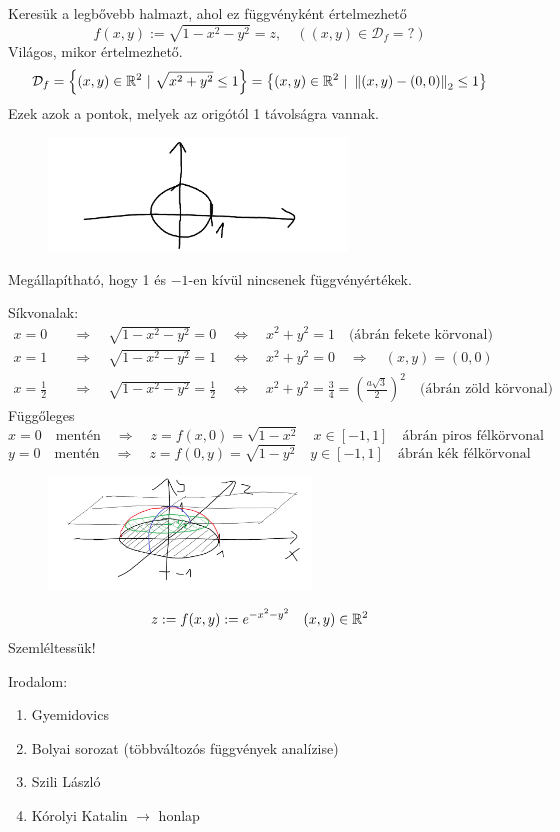 \documentclass[a4paper,11.5pt]{article}
\newcommand{\norm}[1]{\left\lVert#1\right\rVert}
\begin{document}
	\begin{task}Keresük a legbővebb halmazt, ahol ez függvényként értelmezhető
		\[ f(x,y):=\sqrt{1-x^2-y^2}=z,\quad ((x,y)\in\mathcal{D}_f=?) \]
		Világos, mikor értelmezhető.
		\[ \mathcal{D}_f=\left\{(x,y)\in\R^2~|~\sqrt{x^2+y^2}\leq 1 \right\}=\left\{ (x,y)\in\R^2~|~\norm{(x,y)-(0,0)}_2\leq 1 \right\} \]
		Ezek azok a pontok, melyek az origótól 1 távolságra vannak.
		\begin{figure}[H]
			\centering
			\includegraphics[height=3cm]{kepek/22.png}
			\caption{}
		\end{figure}
		Megállapítható, hogy 1 és $-1$-en kívül nincsenek függvényértékek.
		\smallskip
		
		Síkvonalak:
		\begin{align*}
			x=0&\quad \Rightarrow\quad \sqrt{1-x^2-y^2}=0\quad \Leftrightarrow\quad x^2+y^2=1 \quad \text{(ábrán fekete körvonal)}\\
			x=1&\quad \Rightarrow\quad \sqrt{1-x^2-y^2}=1\quad \Leftrightarrow\quad x^2+y^2=0\quad \Rightarrow\quad (x,y)=(0,0) \\
			x=\frac{1}{2}&\quad \Rightarrow\quad \sqrt{1-x^2-y^2}=\frac{1}{2}\quad \Leftrightarrow\quad x^2+y^2=\frac{3}{4}=\left(\frac{a\sqrt{3}}{2}\right)^2 \quad \text{(ábrán zöld körvonal)}
		\end{align*}
		Függőleges
		\[ x=0\quad \text{mentén}\quad \Rightarrow\quad z=f(x,0)=\sqrt{1-x^2}\quad x\in[-1,1]\quad \text{ábrán piros félkörvonal} \]
		\[ y=0\quad \text{mentén}\quad \Rightarrow\quad  z=f(0,y)=\sqrt{1-y^2}\quad y\in[-1,1]\quad \text{ábrán kék félkörvonal} \]
		\begin{figure}[H]
			\centering
			\includegraphics[height=3cm]{kepek/23.png}
			\caption{}
		\end{figure}
	\end{task}
	\begin{exercise}
		\[ z:=f(x,y):=e^{-x^2-y^2}\quad (x,y)\in\mathbb{R}^2 \]
		Szemléltessük!
	\end{exercise}
	\begin{note}
		Irodalom:
		\begin{enumerate}
			\item Gyemidovics
			\item Bolyai sorozat (többváltozós függvények analízise)
			\item Szili László
			\item Kórolyi Katalin $\rightarrow$ honlap
		\end{enumerate}
	\end{note}
\end{document}

